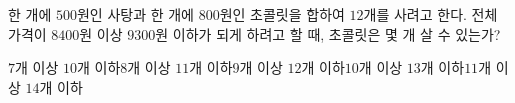 한 개에 $500$원인 사탕과 한 개에 $800$원인 초콜릿을 합하여 $12$개를 사려고 한다. 전체 가격이 $8400$원 이상 $9300$원 이하가 되게 하려고 할 때, 초콜릿은 몇 개 살 수 있는가?
\begin{choicesii}{$7$개 이상 $10$개 이하}{$8$개 이상 $11$개 이하}{$9$개 이상 $12$개 이하}{$10$개 이상 $13$개 이하}{$11$개 이상 $14$개 이하}\end{choicesii}
